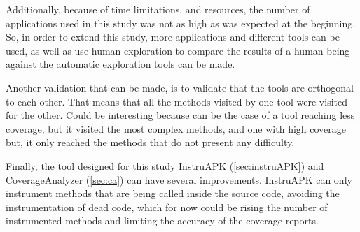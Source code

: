 Additionally, because of time limitations, and resources, the number of applications used in this study was not as high as was expected at the beginning. So, in order to extend this study, more applications and different tools can be used, as well as use human exploration to compare the results of a human-being against the automatic exploration tools can be made.

Another validation that can be made, is to validate that the tools are orthogonal to each other. That means that all the methods visited by one tool were visited for the other. Could be interesting because can be the case of a tool reaching less coverage, but it visited the most complex methods, and one with high coverage but, it only reached the methods that do not present any difficulty. 

Finally, the tool designed for this study InstruAPK (\ref{sec:instruAPK}) and CoverageAnalyzer (\ref{sec:ca}) can have several improvements. InstruAPK can only instrument methods that are being called inside the source code, avoiding the instrumentation of dead code, which for now could be rising the number of instrumented methods and limiting the accuracy of the coverage reports.
